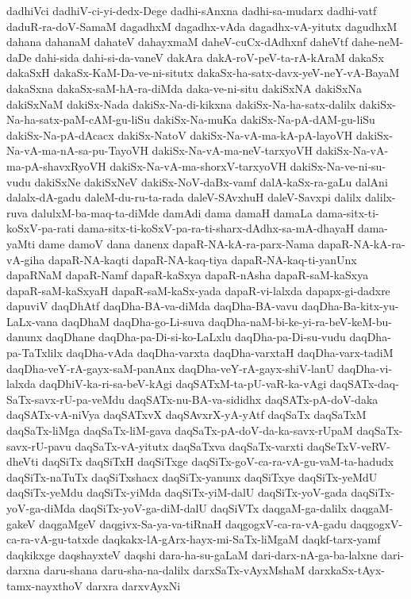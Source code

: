 {dadhiVci
dadhiV-ci-yi-dedx-Dege
dadhi-sAnxna
dadhi-sa-mudarx
dadhi-vatf
daduR-ra-doV-SamaM
dagadhxM
dagadhx-vAda
dagadhx-vA-yitutx
dagudhxM
dahana
dahanaM
dahateV
dahayxmaM
daheV-cuCx-dAdhxnf
daheVtf
dahe-neM-daDe
dahi-sida
dahi-si-da-vaneV
dakAra
dakA-roV-peV-ta-rA-kAraM
dakaSx
dakaSxH
dakaSx-KaM-Da-ve-ni-situtx
dakaSx-ha-satx-davx-yeV-neY-vA-BayaM
dakaSxna
dakaSx-saM-hA-ra-diMda
daka-ve-ni-situ
dakiSxNA
dakiSxNa
dakiSxNaM
dakiSx-Nada
dakiSx-Na-di-kikxna
dakiSx-Na-ha-satx-dalilx
dakiSx-Na-ha-satx-paM-cAM-gu-liSu
dakiSx-Na-muKa
dakiSx-Na-pA-dAM-gu-liSu
dakiSx-Na-pA-dAcacx
dakiSx-NatoV
dakiSx-Na-vA-ma-kA-pA-layoVH
dakiSx-Na-vA-ma-nA-sa-pu-TayoVH
dakiSx-Na-vA-ma-neV-tarxyoVH
dakiSx-Na-vA-ma-pA-shavxRyoVH
dakiSx-Na-vA-ma-shorxV-tarxyoVH
dakiSx-Na-ve-ni-su-vudu
dakiSxNe
dakiSxNeV
dakiSx-NoV-daBx-vamf
dalA-kaSx-ra-gaLu
dalAni
dalalx-dA-gadu
daleM-du-ru-ta-rada
daleV-SAvxhuH
daleV-Savxpi
dalilx
dalilx-ruva
dalulxM-ba-maq-ta-diMde
damAdi
dama
damaH
damaLa
dama-sitx-ti-koSxV-pa-rati
dama-sitx-ti-koSxV-pa-ra-ti-sharx-dAdhx-sa-mA-dhayaH
dama-yaMti
dame
damoV
dana
danenx
dapaR-NA-kA-ra-parx-Nama
dapaR-NA-kA-ra-vA-giha
dapaR-NA-kaqti
dapaR-NA-kaq-tiya
dapaR-NA-kaq-ti-yanUnx
dapaRNaM
dapaR-Namf
dapaR-kaSxya
dapaR-nAsha
dapaR-saM-kaSxya
dapaR-saM-kaSxyaH
dapaR-saM-kaSx-yada
dapaR-vi-lalxda
dapapx-gi-dadxre
dapuviV
daqDhAtf
daqDha-BA-va-diMda
daqDha-BA-vavu
daqDha-Ba-kitx-yu-LaLx-vana
daqDhaM
daqDha-go-Li-suva
daqDha-naM-bi-ke-yi-ra-beV-keM-bu-danunx
daqDhane
daqDha-pa-Di-si-ko-LaLxlu
daqDha-pa-Di-su-vudu
daqDha-pa-TaTxlilx
daqDha-vAda
daqDha-varxta
daqDha-varxtaH
daqDha-varx-tadiM
daqDha-veY-rA-gayx-saM-panAnx
daqDha-veY-rA-gayx-shiV-lanU
daqDha-vi-lalxda
daqDhiV-ka-ri-sa-beV-kAgi
daqSATxM-ta-pU-vaR-ka-vAgi
daqSATx-daq-SaTx-savx-rU-pa-veMdu
daqSATx-nu-BA-va-sididhx
daqSATx-pA-doV-daka
daqSATx-vA-niVya
daqSATxvX
daqSAvxrX-yA-yAtf
daqSaTx
daqSaTxM
daqSaTx-liMga
daqSaTx-liM-gava
daqSaTx-pA-doV-da-ka-savx-rUpaM
daqSaTx-savx-rU-pavu
daqSaTx-vA-yitutx
daqSaTxva
daqSaTx-varxti
daqSeTxV-veRV-dheVti
daqSiTx
daqSiTxH
daqSiTxge
daqSiTx-goV-ca-ra-vA-gu-vaM-ta-hadudx
daqSiTx-naTuTx
daqSiTxshacx
daqSiTx-yanunx
daqSiTxye
daqSiTx-yeMdU
daqSiTx-yeMdu
daqSiTx-yiMda
daqSiTx-yiM-dalU
daqSiTx-yoV-gada
daqSiTx-yoV-ga-diMda
daqSiTx-yoV-ga-diM-dalU
daqSiVTx
daqgaM-ga-dalilx
daqgaM-gakeV
daqgaMgeV
daqgivx-Sa-ya-va-tiRnaH
daqgogxV-ca-ra-vA-gadu
daqgogxV-ca-ra-vA-gu-tatxde
daqkakx-lA-gArx-hayx-mi-SaTx-liMgaM
daqkf-tarx-yamf
daqkikxge
daqshayxteV
daqshi
dara-ha-su-gaLaM
dari-darx-nA-ga-ba-lalxne
dari-darxna
daru-shana
daru-sha-na-dalilx
darxSaTx-vAyxMshaM
darxkaSx-tAyx-tamx-nayxthoV
darxra
darxvAyxNi
}
